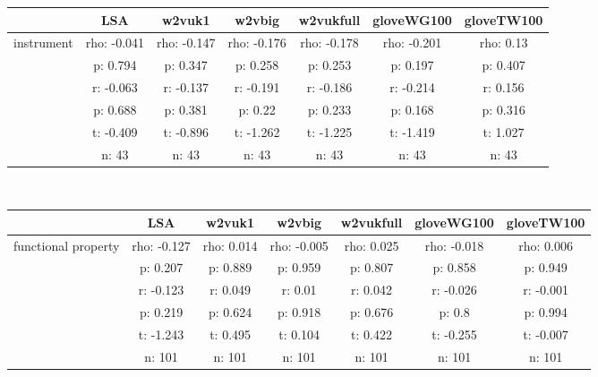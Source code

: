 \documentclass{article}
\begin{document}
\begin{tabular}{ccccccc|}\cline{2-7}
&\multicolumn{1}{|c}{LSA} & w2vuk1 & w2vbig & w2vukfull & gloveWG100 & gloveTW100 \\\hline
\multicolumn{1}{|c|}{\multirow{6}{*}{instrument}} & rho: -0.041 & rho: -0.147 & rho: -0.176 & rho: -0.178 & rho: -0.201 & rho: 0.13 \\
\multicolumn{1}{|c|}{} & p: 0.794 & p: 0.347 & p: 0.258 & p: 0.253 & p: 0.197 & p: 0.407 \\
\multicolumn{1}{|c|}{} & r: -0.063 & r: -0.137 & r: -0.191 & r: -0.186 & r: -0.214 & r: 0.156 \\
\multicolumn{1}{|c|}{} & p: 0.688 & p: 0.381 & p: 0.22 & p: 0.233 & p: 0.168 & p: 0.316 \\
\multicolumn{1}{|c|}{} & t: -0.409 & t: -0.896 & t: -1.262 & t: -1.225 & t: -1.419 & t: 1.027 \\
\multicolumn{1}{|c|}{} & n: 43 & n: 43 & n: 43 & n: 43 & n: 43 & n: 43 \\
\hline
\end{tabular}\\
\begin{tabular}{ccccccc|}\cline{2-7}
&\multicolumn{1}{|c}{LSA} & w2vuk1 & w2vbig & w2vukfull & gloveWG100 & gloveTW100 \\\hline
\multicolumn{1}{|c|}{\multirow{6}{*}{functional property}} & rho: -0.127 & rho: 0.014 & rho: -0.005 & rho: 0.025 & rho: -0.018 & rho: 0.006 \\
\multicolumn{1}{|c|}{} & p: 0.207 & p: 0.889 & p: 0.959 & p: 0.807 & p: 0.858 & p: 0.949 \\
\multicolumn{1}{|c|}{} & r: -0.123 & r: 0.049 & r: 0.01 & r: 0.042 & r: -0.026 & r: -0.001 \\
\multicolumn{1}{|c|}{} & p: 0.219 & p: 0.624 & p: 0.918 & p: 0.676 & p: 0.8 & p: 0.994 \\
\multicolumn{1}{|c|}{} & t: -1.243 & t: 0.495 & t: 0.104 & t: 0.422 & t: -0.255 & t: -0.007 \\
\multicolumn{1}{|c|}{} & n: 101 & n: 101 & n: 101 & n: 101 & n: 101 & n: 101 \\
\hline
\end{tabular}\\
\end{document}
